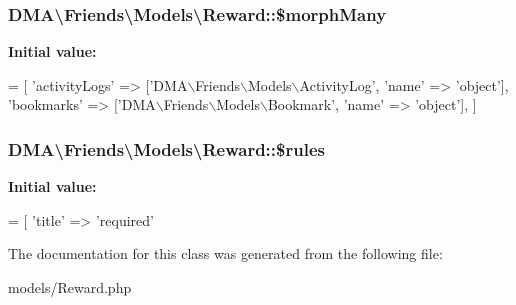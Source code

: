 \subsubsection[{\$morph\+Many}]{\setlength{\rightskip}{0pt plus 5cm}D\+M\+A\textbackslash{}\+Friends\textbackslash{}\+Models\textbackslash{}\+Reward\+::\$morph\+Many}\label{classDMA_1_1Friends_1_1Models_1_1Reward_a471e1042553519781408b0ebe6133397}
{\bfseries Initial value\+:}
\begin{DoxyCode}
= [ 
        \textcolor{stringliteral}{'activityLogs'}  => [\textcolor{stringliteral}{'DMA\(\backslash\)Friends\(\backslash\)Models\(\backslash\)ActivityLog'}, \textcolor{stringliteral}{'name'} => \textcolor{stringliteral}{'object'}],
        \textcolor{stringliteral}{'bookmarks'}     => [\textcolor{stringliteral}{'DMA\(\backslash\)Friends\(\backslash\)Models\(\backslash\)Bookmark'}, \textcolor{stringliteral}{'name'} => \textcolor{stringliteral}{'object'}],
    ]
\end{DoxyCode}
\hypertarget{classDMA_1_1Friends_1_1Models_1_1Reward_ab0f53a612317c68e59e32e0c4a4a2590}{}
\subsubsection[{\$rules}]{\setlength{\rightskip}{0pt plus 5cm}D\+M\+A\textbackslash{}\+Friends\textbackslash{}\+Models\textbackslash{}\+Reward\+::\$rules}\label{classDMA_1_1Friends_1_1Models_1_1Reward_ab0f53a612317c68e59e32e0c4a4a2590}
{\bfseries Initial value\+:}
\begin{DoxyCode}
= [ 
        \textcolor{stringliteral}{'title'} => \textcolor{stringliteral}{'required'}
\end{DoxyCode}


The documentation for this class was generated from the following file\+:\begin{DoxyCompactItemize}
\item 
models/Reward.\+php\end{DoxyCompactItemize}
